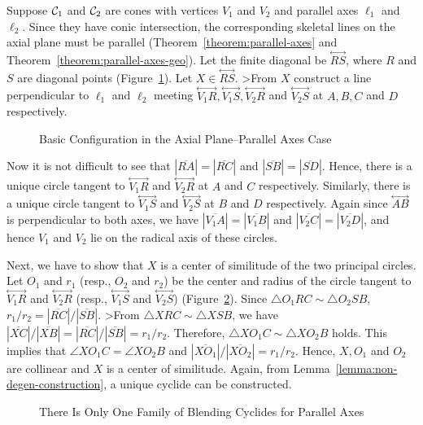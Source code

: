      Suppose ${\cal C}_1$ and ${\cal C}_2$ are cones with vertices $V_1$ and
$V_2$ and parallel axes $\ell_1$ and $\ell_2$.  Since they have conic 
intersection, the corresponding skeletal lines on the axial plane 
must be parallel (Theorem~\ref{theorem:parallel-axes} and
Theorem~\ref{theorem:parallel-axes-geo}).  Let the finite diagonal be
$\stackrel{\longleftrightarrow}{RS}$, where $R$ and $S$ are diagonal points
(Figure~\ref{fig:para-cyclide}).  Let $X\in\stackrel{\longleftrightarrow}{RS}$.
>From $X$ construct a line perpendicular to $\ell_1$ and $\ell_2$ meeting
$\stackrel{\longleftrightarrow}{V_1R}, \stackrel{\longleftrightarrow}{V_1S},
\stackrel{\longleftrightarrow}{V_2R}$ and 
$\stackrel{\longleftrightarrow}{V_2S}$ at $A, B, C$ and $D$ respectively.
\begin{figure}
\vspace{6cm}
\caption{Basic Configuration in the Axial Plane--Parallel Axes Case}
\label{fig:para-cyclide}
\end{figure}

     Now it is not difficult to see that $|\overline{RA}|=|\overline{RC}|$ and
$|\overline{SB}|=|\overline{SD}|$.  Hence, there is a unique circle tangent to
$\stackrel{\longleftrightarrow}{V_1R}$ and 
$\stackrel{\longleftrightarrow}{V_2R}$ at $A$ and $C$ respectively.  Similarly,
there is a unique circle tangent to $\stackrel{\longleftrightarrow}{V_1S}$ and 
$\stackrel{\longleftrightarrow}{V_2S}$ at $B$ and $D$ respectively.
Again since $\stackrel{\longleftrightarrow}{AB}$ is perpendicular to
both axes, we have
$|\overline{V_1A}|=|\overline{V_1B}|$ and 
$|\overline{V_2C}|=|\overline{V_2D}|$, and hence $V_1$ and $V_2$ lie on the
radical axis of these circles.

     Next, we have to show that $X$ is a center of similitude of the two
principal circles.  Let $O_1$ and $r_1$ (resp., $O_2$ and $r_2$) be the center
and radius of the circle tangent to
$\stackrel{\longleftrightarrow}{V_1R}$ and
$\stackrel{\longleftrightarrow}{V_2R}$ (resp.,
$\stackrel{\longleftrightarrow}{V_1S}$ and
$\stackrel{\longleftrightarrow}{V_2S}$) (Figure~\ref{fig:para-1-family}).
Since $\bigtriangleup O_1RC\sim\bigtriangleup O_2SB$, 
$r_1/r_2=|\overline{RC}|/|\overline{SB}|$.  
>From $\bigtriangleup XRC\sim\bigtriangleup XSB$, we have
$|\overline{XC}|/|\overline{XB}|=|\overline{RC}|/|\overline{SB}|=r_1/r_2$.
Therefore, $\bigtriangleup XO_1C\sim \bigtriangleup XO_2B$ holds.
This implies that $\angle XO_1C=\angle XO_2B$ and
$|\overline{XO_1}|/|\overline{XO_2}|=r_1/r_2$.  Hence, $X, O_1$ and $O_2$ are
collinear and $X$ is a center of similitude.  
Again, from Lemma~\ref{lemma:non-degen-construction}, a unique cyclide can be
constructed.
\begin{figure}
\vspace{6cm}
\caption{There Is Only One Family of Blending Cyclides for Parallel Axes}
\label{fig:para-1-family}
\end{figure}

